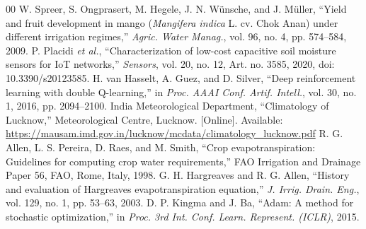 \documentclass[conference]{IEEEtran}
\begin{document}
\begin{thebibliography}{00}
 W. Spreer, S. Ongprasert, M. Hegele, J. N. W\"{u}nsche, and J. M\"{u}ller, ``Yield and fruit development in mango (\textit{Mangifera indica} L. cv. Chok Anan) under different irrigation regimes,'' \textit{Agric. Water Manag.}, vol. 96, no. 4, pp. 574--584, 2009.
 P. Placidi \textit{et al.}, ``Characterization of low-cost capacitive soil moisture sensors for IoT networks,'' \textit{Sensors}, vol. 20, no. 12, Art. no. 3585, 2020, doi: 10.3390/s20123585.
 H. van Hasselt, A. Guez, and D. Silver, ``Deep reinforcement learning with double Q-learning,'' in \textit{Proc. AAAI Conf. Artif. Intell.}, vol. 30, no. 1, 2016, pp. 2094--2100.
 India Meteorological Department, ``Climatology of Lucknow,'' Meteorological Centre, Lucknow. [Online]. Available: \url{https://mausam.imd.gov.in/lucknow/mcdata/climatology_lucknow.pdf}
 R. G. Allen, L. S. Pereira, D. Raes, and M. Smith, ``Crop evapotranspiration: Guidelines for computing crop water requirements,'' FAO Irrigation and Drainage Paper 56, FAO, Rome, Italy, 1998.
 G. H. Hargreaves and R. G. Allen, ``History and evaluation of Hargreaves evapotranspiration equation,'' \textit{J. Irrig. Drain. Eng.}, vol. 129, no. 1, pp. 53--63, 2003.
 D. P. Kingma and J. Ba, ``Adam: A method for stochastic optimization,'' in \textit{Proc. 3rd Int. Conf. Learn. Represent. (ICLR)}, 2015.
\end{thebibliography}
\end{document}
